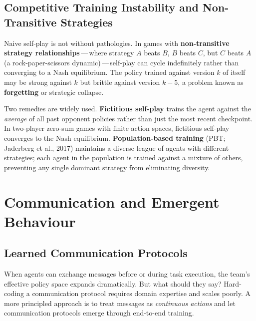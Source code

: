 \subsection{Competitive Training Instability and Non-Transitive Strategies}

Naive self-play is not without pathologies. In games with
\textbf{non-transitive strategy
relationships}\,---\,where strategy
$A$ beats $B$, $B$ beats $C$, but $C$ beats $A$ (a rock-paper-scissors
dynamic)\,---\,self-play can cycle indefinitely rather than converging
to a Nash equilibrium. The policy trained against version $k$ of itself
may be strong against $k$ but brittle against version $k-5$, a problem
known as \textbf{forgetting} or
strategic collapse.

Two remedies are widely used. \textbf{Fictitious
self-play} trains the agent against the
\emph{average} of all past opponent policies rather than just the most
recent checkpoint. In two-player zero-sum games with finite action
spaces, fictitious self-play converges to the Nash equilibrium.
\textbf{Population-based training}
(PBT; Jaderberg et al., 2017) maintains a diverse league of agents with
different strategies; each agent in the population is trained against
a mixture of others, preventing any single dominant strategy from
eliminating diversity.

\section{Communication and Emergent Behaviour}
\label{sec:communication}

\subsection{Learned Communication Protocols}

When agents can exchange messages before or during task execution,
the team's effective policy space expands dramatically. But what
should they say? Hard-coding a communication protocol requires
domain expertise and scales poorly. A more principled approach is
to treat messages as \emph{continuous actions} and let communication
protocols emerge through end-to-end training.

